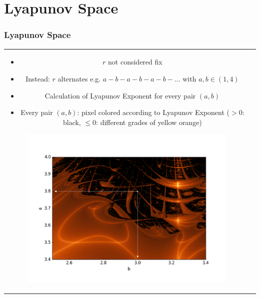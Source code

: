 \documentclass[ignorenonframetext]{beamer}
\begin{document}
\section*{Lyapunov Space}
\begin{frame}
\frametitle{Lyapunov Space}
\begin{tabular}{cr}
\begin{minipage}[t]{0.5\textwidth}
\vspace*{5pt}
\begin{itemize}	
\item $r$ not considered fix
\item Instead: $r$ alternates e.g. $a-b-a-b-a-b-...$ with $a,b\in (1,4)$
\item Calculation of Lyapunov Exponent for every pair $(a,b)$ 
\item Every pair $(a,b)$: pixel colored according to Lyapunov Exponent ($>0$: black, $\leq0$: different grades of yellow orange)
\end{itemize}
\end{minipage}

\begin{minipage}[t]{0.4\textwidth}
\begin{figure}[htbp]
\includegraphics[width = \textwidth]{erklaerung.png}
\end{figure}
\end{minipage}
\end{tabular}
\end{frame}
\end{document}
